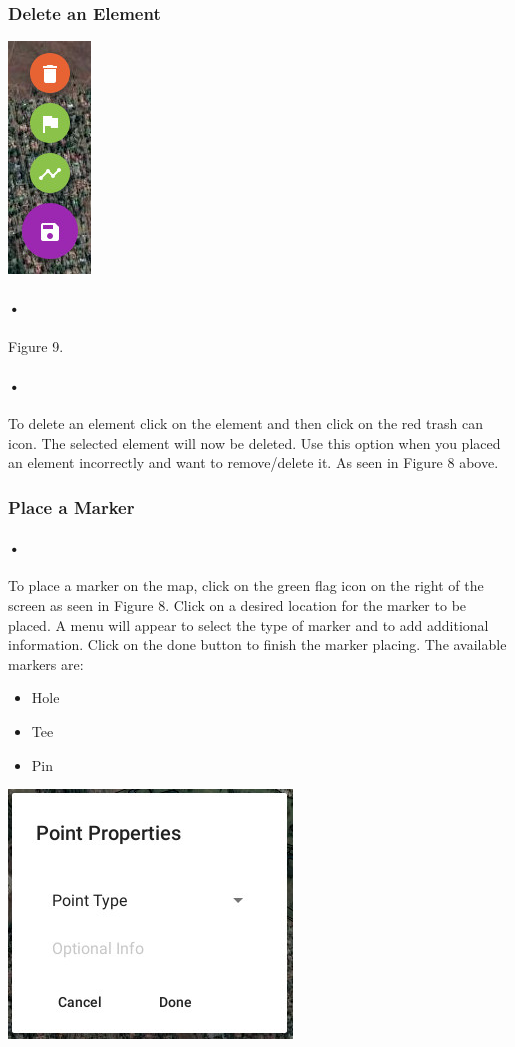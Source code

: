 \documentclass{article}
\begin{document}
    \subsubsection{Delete an Element}
    \includegraphics[scale=1.5]{8_map_controls}
	\paragraph{•}
    Figure 9.
    \paragraph{•}
    To delete an element click on the element and then click on the red trash can icon. The selected element will now be deleted. Use this option when you placed an element incorrectly and want to remove/delete it. As seen in Figure 8 above.
    
    \subsubsection{Place a Marker}
	\paragraph{•}
	To place a marker on the map, click on the green flag icon on the right of the screen as seen in Figure 8. Click on a desired location for the marker to be placed. A menu will appear to select the type of marker and to add additional information. Click on the done button to finish the marker placing. The available markers are:
	
	\begin{itemize}
	\item Hole
	\item Tee
	\item Pin
	\end{itemize}
	

    \includegraphics[scale=1.5]{11_point}
	
\end{document}
